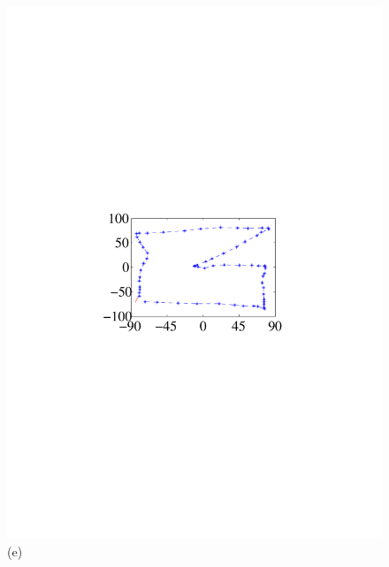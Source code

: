 \begin{figure}[!t]
{\begin{minipage}[t]{0.15\textwidth}
                \includegraphics[width=\textwidth]{fig/protection2-1.pdf}\\
                \centering \footnotesize (e)
             \end{minipage}
        }
        \hspace{-0.3cm}
\end{figure}
